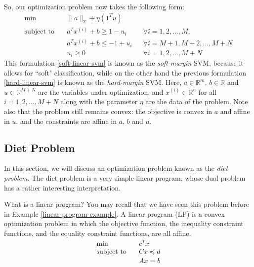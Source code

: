 \documentclass[a4paper]{article}
\theoremstyle{definition}
\begin{document}
So, our optimization problem now takes the following form:
\begin{equation}
	\label{soft-linear-svm}
	\begin{aligned}
		\min \quad & \| a \|_2 + \eta (1^T u) && \\
		\text{subject to} \quad & a^T x^{(i)} + b \geq 1 - u_i && \forall i = 1, 2, \dots, M, \\
		& a^T x^{(i)} + b \leq -1 + u_i && \forall i = M{+}1, M{+}2, \dots, M{+}N \\
		& u_i \geq 0 && \forall i = 1, 2, \dots, M{+}N
	\end{aligned}
\end{equation}
This formulation \eqref{soft-linear-svm} is known as the \textit{soft-margin} SVM, because it allows for ``soft" classification, while on the other hand the previous formulation \eqref{hard-linear-svm} is known as the \textit{hard-margin} SVM.
Here, $a \in \mathbb{R}^m$, $b \in \mathbb{R}$ and $u \in \mathbb{R}^{M{+}N}$ are the variables under optimization, and $x^{(i)} \in \mathbb{R}^n$ for all $i = 1, 2, \dots, M{+}N$ along with the parameter $\eta$ are the data of the problem.
Note also that the problem still remains convex: the objective is convex in $a$ and affine in $u$, and the constraints are affine in $a$, $b$ and $u$.

\subsection{Diet Problem}

In this section, we will discuss an optimization problem known as the \textit{diet problem}.
The diet problem is a very simple linear program, whose dual problem has a rather interesting interpretation.

What is a linear program?
You may recall that we have seen this problem before in Example \ref{linear-program-example}.
A linear program (LP) is a convex optimization problem in which the objective function, the inequality constraint functions, and the equality constraint functions, are all affine.
\begin{equation}
	\label{linear-program}
	\begin{aligned}
		\min \quad & c^T x \\
		\text{subject to} \quad & Cx \preceq d \\
		& Ax = b
	\end{aligned}
\end{equation}
\end{document}
